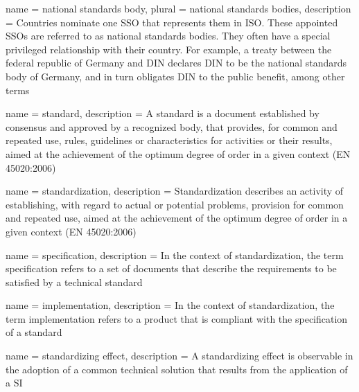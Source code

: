  { name = {national standards body}, plural =
  {national standards bodies}, description = {Countries nominate one
    \gls{SSO} that represents them in \gls{ISO}. These appointed
    \glspl{SSO} are referred to as national standards bodies. They
    often have a special privileged relationship with their
    country. For example, a treaty between the federal republic of
    Germany and DIN declares DIN to be the national standards body of
    Germany, and in turn obligates DIN to the public benefit, among
    other terms}}

 { name = {standard},
  description = {A standard is a document established by consensus and
    approved by a recognized body, that provides, for common and
    repeated use, rules, guidelines or characteristics for activities
    or their results, aimed at the achievement of the optimum degree
    of order in a given context (EN 45020:2006)} }

 { name = {standardization},
  description = {Standardization describes an activity of
    establishing, with regard to actual or potential problems,
    provision for common and repeated use, aimed at the achievement of
    the optimum degree of order in a given context (EN 45020:2006)} }



 { name = {specification}, description = {In
    the context of \gls{standardization}, the term specification
    refers to a set of documents that describe the requirements to be
    satisfied by a technical standard} }

 { name = {implementation}, description = {In
    the context of \gls{standardization}, the term implementation
    refers to a product that is compliant with the specification of a
    standard} }

 { name = {standardizing effect}, description = {
    A standardizing effect is observable in the adoption of a common
    technical solution that results from the application of a
    \gls{SI} } }

